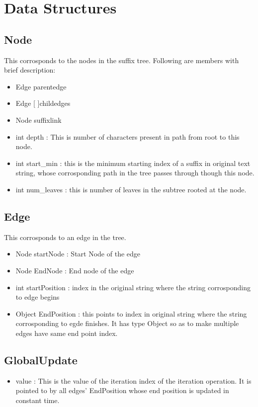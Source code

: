 \documentclass[a4paper]{article}
\begin{document}
\section{Data Structures}
\subsection {Node}
This corrosponds to the nodes in the suffix tree.
Following are members with brief description: 
\begin{itemize}
\item Edge parentedge
\item Edge [ ]childedges 
\item Node suffixlink
\item int depth : This is number of characters present in path from root to this node.
\item int start\_min : this is the minimum starting index of a suffix in original text string, whose corrosponding path in the tree passes through though this node.
\item int num\_leaves : this is number of leaves in the subtree rooted at the node.

\end{itemize}
\subsection{Edge}
This corrosponds to an edge in the tree.
\begin{itemize}
\item Node startNode : Start Node of the edge
\item Node EndNode : End node of the edge
\item int startPosition : index in the original string where the string corrosponding to edge begins
\item Object EndPosition : this points to index in original string where the string corrosponding to egde finishes. It has type Object so as to make multiple edges have same end point index.
\end{itemize}
\subsection{GlobalUpdate}
\begin{itemize}
\item value : This is the value of the iteration index of the iteration operation. It is pointed to by all edges' EndPosition whose end position is updated in constant time.
\end{itemize}
\end{document}
